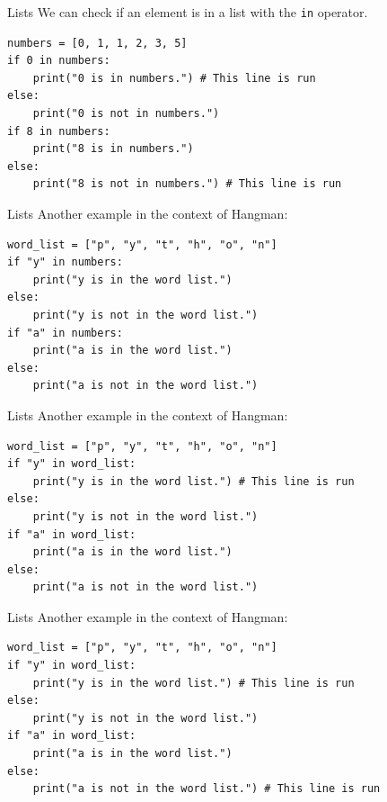 \documentclass[dvipsnames, svgnames, x11names, handout]{beamer}
\begin{document}
\begin{frame}[fragile]{Lists}
We can check if an element is in a list with the \texttt{in} operator.\pause

\begin{verbatim}
numbers = [0, 1, 1, 2, 3, 5]
if 0 in numbers:
    print("0 is in numbers.") # This line is run
else:
    print("0 is not in numbers.")
if 8 in numbers:
    print("8 is in numbers.")
else:
    print("8 is not in numbers.") # This line is run
\end{verbatim}
\end{frame}

\begin{frame}[fragile]{Lists}
Another example in the context of Hangman:

\begin{verbatim}
word_list = ["p", "y", "t", "h", "o", "n"]
if "y" in numbers:
    print("y is in the word list.")
else:
    print("y is not in the word list.")
if "a" in numbers:
    print("a is in the word list.")
else:
    print("a is not in the word list.")
\end{verbatim}
\end{frame}

\addtocounter{framenumber}{-1}

\begin{frame}[fragile]{Lists}
Another example in the context of Hangman:
    
\begin{verbatim}
word_list = ["p", "y", "t", "h", "o", "n"]
if "y" in word_list:
    print("y is in the word list.") # This line is run
else:
    print("y is not in the word list.")
if "a" in word_list:
    print("a is in the word list.")
else:
    print("a is not in the word list.")
\end{verbatim}
\end{frame}

\addtocounter{framenumber}{-1}

\begin{frame}[fragile]{Lists}
Another example in the context of Hangman:
    
\begin{verbatim}
word_list = ["p", "y", "t", "h", "o", "n"]
if "y" in word_list:
    print("y is in the word list.") # This line is run
else:
    print("y is not in the word list.")
if "a" in word_list:
    print("a is in the word list.")
else:
    print("a is not in the word list.") # This line is run
\end{verbatim}
\end{frame}
\end{document}
